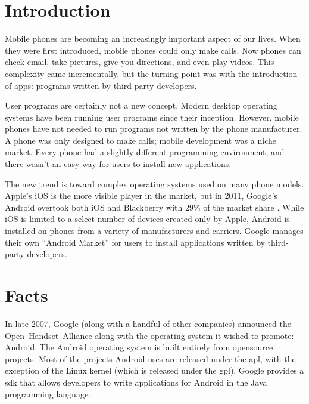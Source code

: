 \documentclass[11pt]{article}
\begin{document}
\begin{multicols}{2}
\setcounter{page}{1}

\section{Introduction} %
\label{sec:intro}

Mobile phones are becoming an increasingly important aspect of our lives.  When
they were first introduced, mobile phones could only make calls.  Now phones can
check email, take pictures, give you directions, and even play videos.  This
complexity came incrementally, but the turning point was with the introduction
of apps: programs written by third-party developers.

User programs are certainly not a new concept.  Modern desktop operating systems
have been running user programs since their inception.  However, mobile phones
have not needed to run programs not written by the phone manufacturer.  A phone
was only designed to make calls; mobile development was a niche market.  Every
phone had a slightly different programming environment, and there wasn't an easy
way for users to install new applications.

The new trend is toward complex operating systems used on many phone models.
Apple's iOS is the more visible player in the market, but in 2011, Google's
Android overtook both iOS and Blackberry with 29\% of the market share
\cite{android-market-share}.  While iOS is limited to a select number of devices
created only by Apple, Android is installed on phones from a variety of
manufacturers and carriers.  Google manages their own ``Android Market'' for
users to install applications written by third-party developers.


\section{Facts} %
\label{sec:facts}

In late 2007, Google (along with a handful of other companies) announced the
Open~Handset~Alliance \cite{open-handset-alliance-ann} along with the operating
system it wished to promote: Android.  The Android operating system is built
entirely from \gls{opensource} projects.  Most of the projects Android uses are
released under the \gls{apl}, with the exception of the Linux kernel (which is
released under the \gls{gpl}).  Google provides a \gls{sdk} that allows
developers to write applications for Android in the Java programming language.


\end{multicols}
\end{document}
